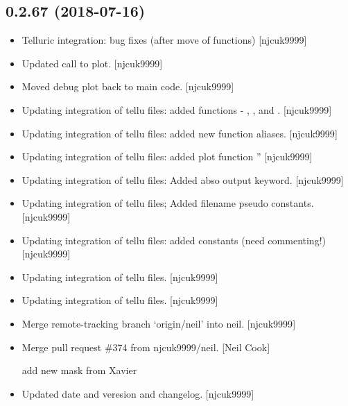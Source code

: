 \documentclass[a4paper,10pt,english]{report}
\begin{document}
\subsection{0.2.67 (2018-07-16)}
\label{\detokenize{misc/changelog:id392}}\begin{itemize}
\item {} 
Telluric integration: bug fixes (after move of functions) {[}njcuk9999{]}

\item {} 
Updated call to plot. {[}njcuk9999{]}

\item {} 
Moved debug plot back to main code. {[}njcuk9999{]}

\item {} 
Updating integration of tellu files: added functions -
, ,
 and . {[}njcuk9999{]}

\item {} 
Updating integration of tellu files: added new function aliases.
{[}njcuk9999{]}

\item {} 
Updating integration of tellu files: added plot function
” {[}njcuk9999{]}

\item {} 
Updating integration of tellu files: Added abso output keyword.
{[}njcuk9999{]}

\item {} 
Updating integration of tellu files; Added filename pseudo constants.
{[}njcuk9999{]}

\item {} 
Updating integration of tellu files: added constants (need
commenting!) {[}njcuk9999{]}

\item {} 
Updating integration of tellu files. {[}njcuk9999{]}

\item {} 
Updating integration of tellu files. {[}njcuk9999{]}

\item {} 
Merge remote-tracking branch ‘origin/neil’ into neil. {[}njcuk9999{]}

\item {} 
Merge pull request \#374 from njcuk9999/neil. {[}Neil Cook{]}

add new mask from Xavier

\item {} 
Updated date and veresion and changelog. {[}njcuk9999{]}

\end{itemize}
\end{document}
